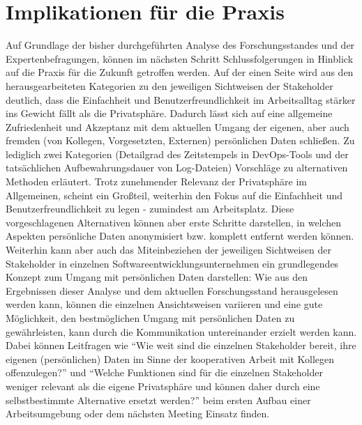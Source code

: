 \section{Implikationen für die Praxis}
Auf Grundlage der bisher durchgeführten Analyse des Forschungsstandes und der Expertenbefragungen, können im nächsten Schritt Schlussfolgerungen in Hinblick auf die Praxis für die Zukunft getroffen werden. Auf der einen Seite wird aus den herausgearbeiteten Kategorien zu den jeweiligen Sichtweisen der Stakeholder deutlich, dass die Einfachheit und Benutzerfreundlichkeit
im Arbeitsalltag stärker ins Gewicht fällt als die Privatsphäre. Dadurch lässt sich auf eine allgemeine Zufriedenheit und Akzeptanz mit dem aktuellen Umgang der eigenen, aber auch fremden (von Kollegen, Vorgesetzten, Externen) persönlichen Daten schließen. Zu lediglich zwei Kategorien (Detailgrad des Zeitstempels in DevOps-Tools und der tatsächlichen Aufbewahrungsdauer von Log-Dateien)
Vorschläge zu alternativen Methoden erläutert. Trotz zunehmender Relevanz der Privatsphäre im Allgemeinen, scheint ein Großteil, weiterhin den Fokus auf die Einfachheit und Benutzerfreundlichkeit zu legen - zumindest am Arbeitsplatz. \newline
Diese vorgeschlagenen Alternativen können aber erste Schritte darstellen, in welchen Aspekten persönliche Daten anonymisiert bzw. komplett entfernt werden können. Weiterhin kann aber auch das Miteinbeziehen der jeweiligen Sichtweisen der Stakeholder in einzelnen Softwareentwicklungsunternehmen ein grundlegendes Konzept zum Umgang mit persönlichen Daten darstellen: Wie aus den Ergebnissen dieser Analyse und dem aktuellen Forschungsstand herausgelesen
werden kann, können die einzelnen Ansichtsweisen variieren und eine gute Möglichkeit, den bestmöglichen Umgang mit persönlichen Daten zu gewährleisten, kann durch die Kommunikation untereinander erzielt werden kann. Dabei können Leitfragen wie \enquote{Wie weit sind die einzelnen Stakeholder bereit, ihre eigenen (persönlichen) Daten im Sinne der kooperativen Arbeit mit Kollegen offenzulegen?} und \enquote{Welche Funktionen sind für die
einzelnen Stakeholder weniger relevant als die eigene Privatsphäre und können daher durch eine selbstbestimmte Alternative ersetzt werden?} beim ersten Aufbau einer Arbeitsumgebung oder dem nächsten Meeting Einsatz finden.

